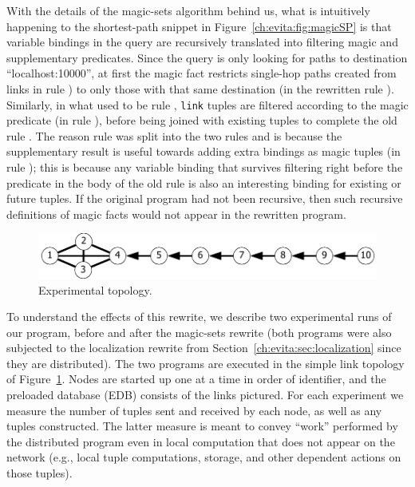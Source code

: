 {With the details of the magic-sets algorithm behind us, what is
intuitively happening to the shortest-path snippet in
Figure~\ref{ch:evita:fig:magicSP} is that variable bindings in the query are
recursively translated into filtering magic and supplementary
predicates. Since the query is only looking for paths to
destination ``localhost:10000'', at first the magic fact restricts single-hop
paths created from links in rule ) to only those with that same 
destination (in the rewritten rule ). Similarly, in what used to 
be rule , {\tt link} tuples are filtered according to the magic predicate (in rule
), before being joined with existing  tuples to
complete the old rule . The reason rule  was split into
the two rules  and  is because the
supplementary result  is useful towards adding extra bindings as
magic tuples (in rule ); this is because any variable
binding that survives filtering right before the 
predicate in the body of the old rule  is also an interesting
binding for existing or future  tuples. If the original
program had not been recursive, then such recursive definitions of magic
facts would not appear in the rewritten program.

\begin{figure}
\centering
\includegraphics[scale=1.2]{figures/Topology}
\caption{Experimental topology.}
\label{ch:evita:fig:topo}
\end{figure}

To understand the effects of this rewrite, we describe two experimental
runs of our program, before and after the magic-sets rewrite (both
programs were also subjected to the localization rewrite from
Section~\ref{ch:evita:sec:localization} since they are distributed).  The two
programs are executed in the simple link topology of
Figure~\ref{ch:evita:fig:topo}. Nodes are started up one at a time in order of
identifier, and the preloaded database (EDB) consists of the links pictured. For each experiment we measure the number of
tuples sent and received by each node, as well as any 
tuples constructed. The latter measure is meant to convey ``work''
performed by the distributed program even in local computation that does
not appear on the network (e.g., local tuple computations, storage, and
other dependent actions on those tuples).

}

